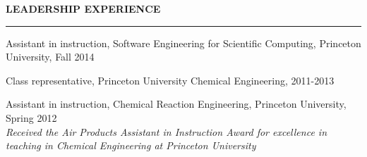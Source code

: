 \documentclass[letterpaper,10pt]{article}
\newenvironment{itemize*}
  {\begin{itemize}
    \setlength{\parskip}{-2pt}}
  {\end{itemize}}
\newcommand{\cvheading}[1]{
\vspace{0.11in}
\noindent
\MakeUppercase{\bf #1}
\vspace{0.05in}
{\hrule height 0.3mm}
\vspace{0.05in}}
\begin{document}
\cvheading{Leadership Experience}
\begin{itemize*}
\item Assistant in instruction, Software Engineering for Scientific Computing, Princeton University, Fall 2014
\item Class representative, Princeton University Chemical Engineering, 2011-2013
\item Assistant in instruction, Chemical Reaction Engineering, Princeton University, Spring 2012  \\
{\em \small Received the Air Products Assistant in Instruction Award for excellence in teaching in Chemical Engineering at Princeton University}
\end{itemize*}
\end{document}
